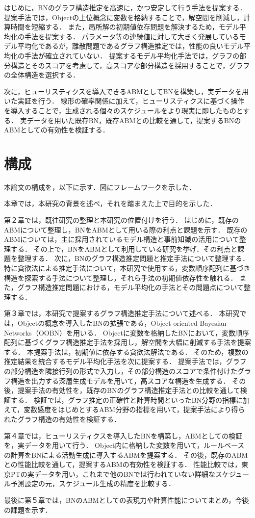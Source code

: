 はじめに，BNのグラフ構造推定を高速に，かつ安定して行う手法を提案する．
提案手法では，Objectの上位概念に変数を格納することで，解空間を削減し，計算時間を短縮する．
また，局所解の初期値依存問題を解決するため，モデル平均化の手法を提案する．
パラメータ等の連続値に対して大きく発展しているモデル平均化であるが\cite{Baydin2018}，離散問題であるグラフ構造推定では，性能の良いモデル平均化の手法が確立されていない\cite{Baydin2018}．
提案するモデル平均化手法では，グラフの部分構造とそのスコアを考慮して，高スコアな部分構造を採用することで，グラフの全体構造を選択する．

次に，ヒューリスティクスを導入できるABMとしてBNを構築し，実データを用いた実証を行う．
線形の確率関係に加えて，ヒューリスティクスに基づく操作を導入することで，生成される個々のスケジュールをより現実に即したものとする．
実データを用いた既存BN，既存ABMとの比較を通して，提案するBNのABMとしての有効性を検証する．

\section{構成}\label{1.3}
本論文の構成を，以下に示す．図にフレームワークを示した．

本章では，本研究の背景を述べ，それを踏まえた上で目的を示した．

第２章では，既往研究の整理と本研究の位置付けを行う．
はじめに，既存のABMについて整理し，BNをABMとして用いる際の利点と課題を示す．
既存のABMについては，主に採用されているモデル構造と事前知識の活用について整理する．
その上で，BNをABMとして利用している研究を挙げ．その利点と課題を整理する．
次に，BNのグラフ構造推定問題と推定手法について整理する．
特に貪欲法による推定手法について，本研究で使用する，変数順序配列に基づき構造を探索する手法について整理し，それら手法の初期値依存性を触れる．
また，グラフ構造推定問題における，モデル平均化の手法とその問題点について整理する．

第３章では，本研究で提案するグラフ構造推定手法について述べる．
本研究では，Objectの概念を導入したBNの拡張である，Object-oriented Bayesian Networks（OOBN）\cite{Baydin2018}を用いる．
Objectに変数を格納したBNにおいて，変数順序配列に基づくグラフ構造推定手法\cite{Baydin2018}を採用し，解空間を大幅に削減する手法を提案する．
本提案手法は，初期値に依存する貪欲法解法である．
そのため，複数の推定結果を統合するモデル平均化手法を次に提案する．
提案手法では，グラフの部分構造を隣接行列の形式で入力し，その部分構造のスコアで条件付けたグラフ構造を出力する深層生成モデル\cite{Baydin2018}を用いて，高スコアな構造を生成する．
その後，提案手法の有効性を，既存のBNのグラフ構造推定手法との比較を通して検証する．
検証では，グラフ推定の正確性と計算時間といったBN分野の指標に加えて，変数感度をはじめとするABM分野の指標を用いて，提案手法により得られたグラフ構造の有効性を検証する．

第４章では，ヒューリスティクスを導入したBNを構築し，ABMとしての検証を，実データを用いて行う．
Object内に格納した変数を用いて，ルールベースの計算をBNによる活動生成に導入するABMを提案する．
その後，既存のABMとの性能比較を通して，提案するABMの有効性を検証する．
性能比較では，東京PTの実データを用い，これまで他のBNでは行われていない詳細なスケジュール予測設定の元，スケジュール生成の精度を比較する．

最後に第５章では，BNのABMとしての表現力や計算性能についてまとめ，今後の課題を示す．